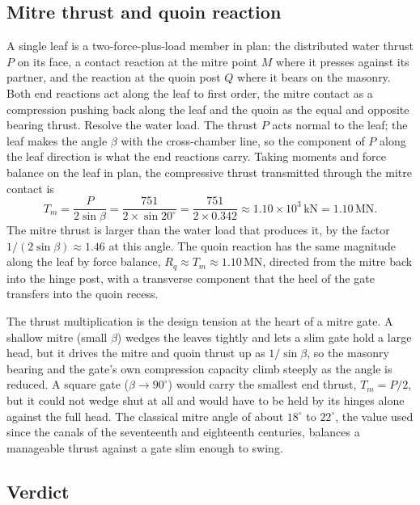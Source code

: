 \subsection{Mitre thrust and quoin reaction}

A single leaf is a two-force-plus-load member in plan: the distributed
water thrust $P$ on its face, a contact reaction at the mitre point $M$
where it presses against its partner, and the reaction at the quoin post
$Q$ where it bears on the masonry. Both end reactions act along the leaf to
first order, the mitre contact as a compression pushing back along the leaf
and the quoin as the equal and opposite bearing thrust. Resolve the water
load. The thrust $P$ acts normal to the leaf; the leaf makes the angle
$\beta$ with the cross-chamber line, so the component of $P$ along the leaf
direction is what the end reactions carry. Taking moments and force balance
on the leaf in plan, the compressive thrust transmitted through the mitre
contact is
\[
T_m = \frac{P}{2\sin\beta}
= \frac{751}{2 \times \sin 20^{\circ}}
= \frac{751}{2 \times 0.342}
\approx 1.10 \times 10^3\,\text{kN}
= 1.10\,\text{MN}.
\]
The mitre thrust is larger than the water load that produces it, by the
factor $1/(2\sin\beta) \approx 1.46$ at this angle. The quoin reaction has
the same magnitude along the leaf by force balance, $R_q \approx T_m
\approx 1.10\,\text{MN}$, directed from the mitre back into the hinge post,
with a transverse component that the heel of the gate transfers into the
quoin recess.

The thrust multiplication is the design tension at the heart of a mitre
gate. A shallow mitre (small $\beta$) wedges the leaves tightly and lets a
slim gate hold a large head, but it drives the mitre and quoin thrust up as
$1/\sin\beta$, so the masonry bearing and the gate's own compression
capacity climb steeply as the angle is reduced. A square gate ($\beta \to
90^{\circ}$) would carry the smallest end thrust, $T_m = P/2$, but it could
not wedge shut at all and would have to be held by its hinges alone against
the full head. The classical mitre angle of about $18^{\circ}$ to
$22^{\circ}$, the value used since the canals of the seventeenth and
eighteenth centuries, balances a manageable thrust against a gate slim
enough to swing.

\subsection{Verdict}


